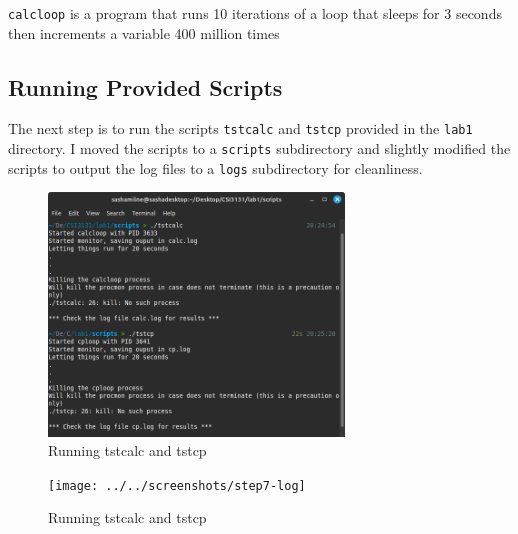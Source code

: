 \noindent
\texttt{calcloop} is a program that runs 10 iterations of a loop that sleeps
for 3 seconds then increments a variable 400 million times

\subsection{Running Provided Scripts}\label{subsec:running-provided-scripts}
The next step is to run the scripts \texttt{tstcalc} and \texttt{tstcp} provided
in the \texttt{lab1} directory.
I moved the scripts to a \texttt{scripts} subdirectory and slightly modified the
scripts to output the log files to a \texttt{logs} subdirectory for cleanliness.
\begin{figure}[H]
    \centering
    \includegraphics[width=0.7\textwidth]{../../screenshots/step7-scripts}
    \caption{Running tstcalc and tstcp}
    \label{fig:step7-scripts}
\end{figure}
\begin{figure}[H]
    \centering
    \texttt{[image: ../../screenshots/step7-log]}
    \caption{Running tstcalc and tstcp}
    \label{fig:step7-log}
\end{figure}